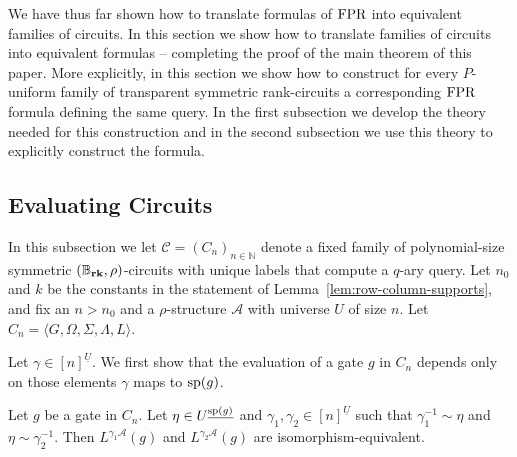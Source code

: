\documentclass[../paper.tex]{subfiles}
\begin{document}
We have thus far shown how to translate formulas of $\text{\upshape FPR}$ into equivalent
families of circuits. In this section we show how to translate families of
circuits into equivalent formulas -- completing the proof of the main theorem of
this paper. More explicitly, in this section we show how to construct for every
$P$-uniform family of transparent symmetric rank-circuits a corresponding $\text{\upshape FPR}$
formula defining the same query. In the first subsection we develop the theory
needed for this construction and in the second subsection we use this theory to explicitly construct
the formula.


\subsection {Evaluating Circuits}
In this subsection we let $\mathcal{C} = (C_n)_{n \in \mathbb{N}}$ denote a
fixed family of polynomial-size symmetric $(\mathbb{B}_{\text{\textbf{rk}}},\rho)$-circuits with unique
labels that compute a $q$-ary query. Let $n_0$ and $k$ be the constants in the
statement of Lemma~\ref{lem:row-column-supports}, and fix an $n > n_0$ and a
$\rho$-structure $\mathcal{A}$ with universe $U$ of size $n$. Let $C_n = \langle
G, \Omega, \Sigma, \Lambda, L \rangle$.

Let $\gamma \in [n]^{\underline{U}}$. We first show that the evaluation of a
gate $g$ in $C_n$ depends only on those elements $\gamma$ maps to $\text{sp}(g)$.

\begin{lem}
	Let $g$ be a gate in $C_n$. Let $\eta \in U^{\underline{\text{sp}(g)}}$ and
  $\gamma_1, \gamma_2 \in [n]^{\underline{U}}$ such that $\gamma^{-1}_1 \sim
  \eta$ and $\eta \sim \gamma^{-1}_2$. Then $L^{\gamma_1 \mathcal{A}}(g)$ and
  $L^{\gamma_2 \mathcal{A}}(g)$ are isomorphism-equivalent.
	\label{lem:support-determines-evaluation}
\end{lem}
\end{document}
